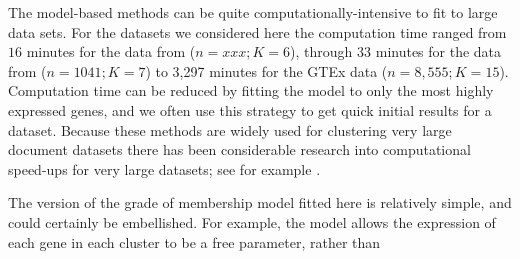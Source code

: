 The model-based methods can be quite computationally-intensive to fit to large data sets.
For the datasets we considered here the computation time ranged from $16$ minutes for the data from \cite{deng} ($n=xxx; K=6$), through $33$ minutes for the 
data from \cite{Jaitin2014} ($n=1041; K=7$) to 3,297 minutes for the GTEx data ($n=8,555; K=15$). 
Computation time can be reduced by fitting the model to only the most highly expressed genes, and we often use this strategy to get quick initial results for a dataset.
Because these methods are widely used for clustering very large document datasets there has been considerable research into 
computational speed-ups for very large datasets; see for example \cite{}. 

The version of the grade of membership model fitted here is relatively simple, and could certainly be embellished. For example,
the model allows the expression of each gene in each cluster to be a free parameter, rather than 


%


